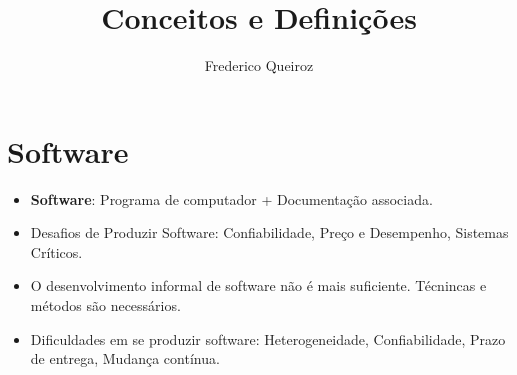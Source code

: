 \documentclass[a4paper, 11pt]{article}
\author{Frederico Queiroz}
\title{Conceitos e Definições}
\begin{document}
\maketitle


\section{Software}
\begin{itemize}
	\item \textbf{Software}: Programa de computador + Documentação associada.
	\item Desafios de Produzir Software: Confiabilidade, Preço e Desempenho, Sistemas Críticos.
	\item O desenvolvimento informal de software não é mais suficiente. Técnincas e métodos são necessários.
	\item Dificuldades em se produzir software: Heterogeneidade, Confiabilidade, Prazo de entrega, Mudança contínua.
\end{itemize}
\end{document}
